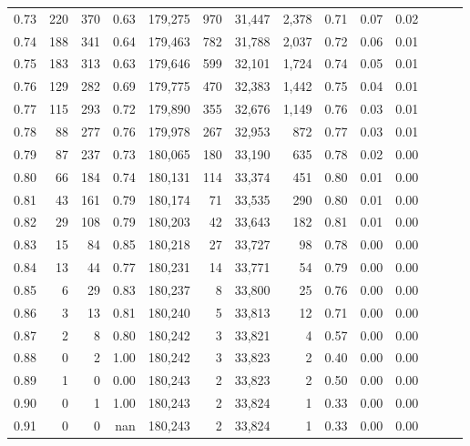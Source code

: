 \begin{tabular}{rrrrrrrrrrrrrr}
0.73 &    220 &  370 &  0.63 &  179,275 &      970 &  31,447 &   2,378 &  0.71 &  0.07 &      0.02 \\
0.74 &    188 &  341 &  0.64 &  179,463 &      782 &  31,788 &   2,037 &  0.72 &  0.06 &      0.01 \\
0.75 &    183 &  313 &  0.63 &  179,646 &      599 &  32,101 &   1,724 &  0.74 &  0.05 &      0.01 \\
0.76 &    129 &  282 &  0.69 &  179,775 &      470 &  32,383 &   1,442 &  0.75 &  0.04 &      0.01 \\
0.77 &    115 &  293 &  0.72 &  179,890 &      355 &  32,676 &   1,149 &  0.76 &  0.03 &      0.01 \\
0.78 &     88 &  277 &  0.76 &  179,978 &      267 &  32,953 &     872 &  0.77 &  0.03 &      0.01 \\
0.79 &     87 &  237 &  0.73 &  180,065 &      180 &  33,190 &     635 &  0.78 &  0.02 &      0.00 \\
0.80 &     66 &  184 &  0.74 &  180,131 &      114 &  33,374 &     451 &  0.80 &  0.01 &      0.00 \\
0.81 &     43 &  161 &  0.79 &  180,174 &       71 &  33,535 &     290 &  0.80 &  0.01 &      0.00 \\
0.82 &     29 &  108 &  0.79 &  180,203 &       42 &  33,643 &     182 &  0.81 &  0.01 &      0.00 \\
0.83 &     15 &   84 &  0.85 &  180,218 &       27 &  33,727 &      98 &  0.78 &  0.00 &      0.00 \\
0.84 &     13 &   44 &  0.77 &  180,231 &       14 &  33,771 &      54 &  0.79 &  0.00 &      0.00 \\
0.85 &      6 &   29 &  0.83 &  180,237 &        8 &  33,800 &      25 &  0.76 &  0.00 &      0.00 \\
0.86 &      3 &   13 &  0.81 &  180,240 &        5 &  33,813 &      12 &  0.71 &  0.00 &      0.00 \\
0.87 &      2 &    8 &  0.80 &  180,242 &        3 &  33,821 &       4 &  0.57 &  0.00 &      0.00 \\
0.88 &      0 &    2 &  1.00 &  180,242 &        3 &  33,823 &       2 &  0.40 &  0.00 &      0.00 \\
0.89 &      1 &    0 &  0.00 &  180,243 &        2 &  33,823 &       2 &  0.50 &  0.00 &      0.00 \\
0.90 &      0 &    1 &  1.00 &  180,243 &        2 &  33,824 &       1 &  0.33 &  0.00 &      0.00 \\
0.91 &      0 &    0 &   nan &  180,243 &        2 &  33,824 &       1 &  0.33 &  0.00 &      0.00 \\

\end{tabular}
